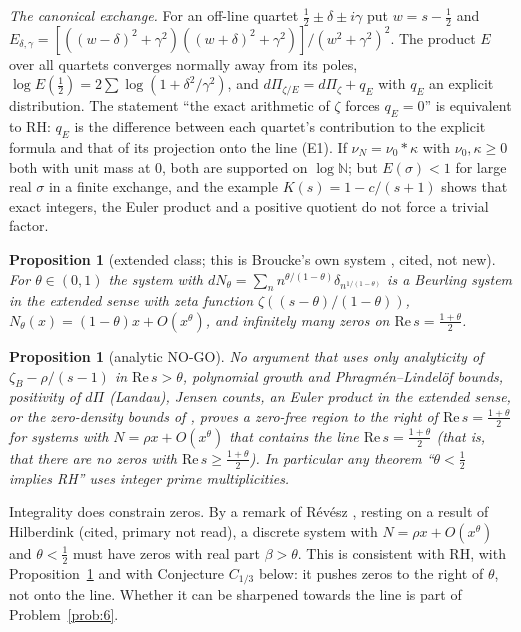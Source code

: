 \documentclass[11pt]{amsart}
\newtheorem{proposition}[theorem]{Proposition}
\theoremstyle{definition}
\theoremstyle{remark}
\newcommand{\N}{\mathbb N}
\newcommand{\Rel}{\mathrm{Re}\,}
\begin{document}
\emph{The canonical exchange.} For an off-line quartet $\frac12\pm\delta\pm i\gamma$ put $w=s-\frac12$ and
$E_{\delta,\gamma}=[((w-\delta)^2+\gamma^2)((w+\delta)^2+\gamma^2)]/(w^2+\gamma^2)^2$. The product $E$ over all quartets
converges normally away from its poles, $\log E(\frac12)=2\sum\log(1+\delta^2/\gamma^2)$, and
$d\Pi_{\zeta/E}=d\Pi_\zeta+q_E$ with $q_E$ an explicit distribution. The statement ``the exact arithmetic of $\zeta$
forces $q_E=0$'' is equivalent to RH: $q_E$ is the difference between each quartet's contribution to the explicit
formula and that of its projection onto the line (E1). If $\nu_N=\nu_0*\kappa$ with $\nu_0,\kappa\ge0$ both with
unit mass at $0$, both are supported on $\log\N$; but $E(\sigma)<1$ for large real $\sigma$ in a finite exchange, and
the example $K(s)=1-c/(s+1)$ shows that exact integers, the Euler product and a positive quotient do not force a
trivial factor.

\begin{proposition}[extended class; this is Broucke's own system \cite{Broucke2024}, cited, not new]\label{prop:zetatheta}
For $\theta\in(0,1)$ the system with $dN_\theta=\sum_nn^{\theta/(1-\theta)}\delta_{n^{1/(1-\theta)}}$ is a Beurling
system in the extended sense with zeta function $\zeta((s-\theta)/(1-\theta))$, $N_\theta(x)=(1-\theta)x+O(x^\theta)$, and
infinitely many zeros on $\Rel s=\frac{1+\theta}2$.
\end{proposition}

\begin{proposition}[analytic NO-GO]\label{prop:analyticnogo}
No argument that uses only analyticity of $\zeta_B-\rho/(s-1)$ in $\Rel s>\theta$, polynomial growth and
Phragm\'en--Lindel\"of bounds, positivity of $d\Pi$ (Landau), Jensen counts, an Euler product in the extended sense,
or the zero-density bounds of \cite{Broucke2024}, proves a zero-free region to the right of $\Rel s=\frac{1+\theta}2$
for systems with $N=\rho x+O(x^\theta)$ that contains the line $\Rel s=\frac{1+\theta}2$ (that is, that there are no
zeros with $\Rel s\ge\frac{1+\theta}2$). In particular any theorem ``$\theta<\frac12$ implies RH'' uses integer prime
multiplicities.
\end{proposition}

\noindent Integrality does constrain zeros. By a remark of R\'ev\'esz \cite[Rem.~7]{Revesz2023}, resting on a result
of Hilberdink \cite{Hilberdink2010} (cited, primary not read), a discrete system with $N=\rho x+O(x^\theta)$ and
$\theta<\frac12$ must have zeros with real part $\beta>\theta$. This is consistent with RH, with
Proposition~\ref{prop:zetatheta} and with Conjecture $C_{1/3}$ below: it pushes zeros to the right of $\theta$, not onto
the line. Whether it can be sharpened towards the line is part of Problem~\ref{prob:6}.
\end{document}
